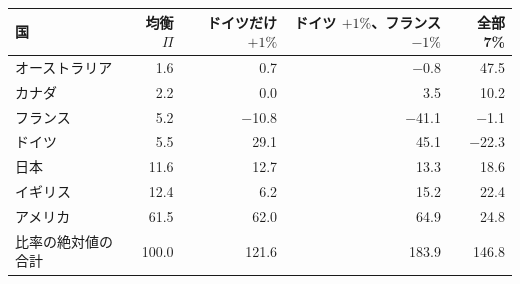 \begin{tabular}{lrrrr}
\toprule
国 & 均衡 $\Pi$ & ドイツだけ $+1\%$ & ドイツ $+1\%$、フランス $-1\%$ & 全部 7\% \\
\midrule
オーストラリア & 1.6 & 0.7 & \ensuremath{-}0.8 & 47.5 \\
カナダ & 2.2 & 0.0 & 3.5 & 10.2 \\
フランス & 5.2 & \ensuremath{-}10.8 & \ensuremath{-}41.1 & \ensuremath{-}1.1 \\
ドイツ & 5.5 & 29.1 & 45.1 & \ensuremath{-}22.3 \\
日本 & 11.6 & 12.7 & 13.3 & 18.6 \\
イギリス & 12.4 & 6.2 & 15.2 & 22.4 \\
アメリカ & 61.5 & 62.0 & 64.9 & 24.8 \\
\midrule
比率の絶対値の合計 & 100.0 & 121.6 & 183.9 & 146.8 \\
\bottomrule
\end{tabular}
